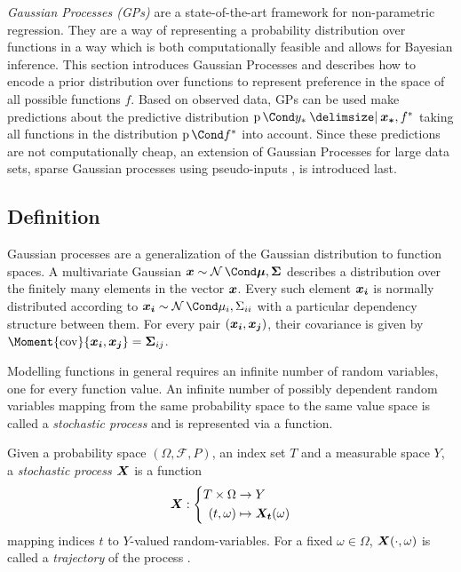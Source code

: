 \emph{Gaussian Processes (GPs)} are a state-of-the-art framework for non-parametric regression.
They are a way of representing a probability distribution over functions in a way which is both computationally feasible and allows for Bayesian inference.
This section introduces Gaussian Processes and describes how to encode a prior distribution over functions to represent preference in the space of all possible functions $f$.
Based on observed data, GPs can be used make predictions about the predictive distribution $\Prob{y_\ast \given \mat{x_\ast}, f^\ast}$ taking all functions in the distribution $\Prob{f^\ast}$ into account.
Since these predictions are not computationally cheap, an extension of Gaussian Processes for large data sets, sparse Gaussian processes using pseudo-inputs \cite{snelson_sparse_2005}, is introduced last.

\subsection{Definition}
Gaussian processes are a generalization of the Gaussian distribution to function spaces.
A multivariate Gaussian $\mat{x} \sim \Gaussian{\mat{\mu}, \mat{\Sigma}}$ describes a distribution over the finitely many elements in the vector $\bm{x}$.
Every such element $\bm{x_i}$ is normally distributed according to $\rv{x_i} \sim \Gaussian{\mu_i, \Sigma_{ii}}$ with a particular dependency structure between them.
For every pair $(\bm{x_i}, \bm{x_j})$, their covariance is given by $\Moment{\cov}{\rv{x_i}, \rv{x_j}} = \mat{\Sigma}_{ij}$.

Modelling functions in general requires an infinite number of random variables, one for every function value.
An infinite number of possibly dependent random variables mapping from the same probability space to the same value space is called a \emph{stochastic process} and is represented via a function.

\begin{definition}
    \label{def:stochastic_process}
    Given a probability space $(\Omega, \mathcal{F}, P)$, an index set $T$ and a measurable space $Y$, a \emph{stochastic process $\bm{X}$} is a function
    \begin{align}
        \bm{X} : \left\{\begin{aligned}
            T \times \Omega &\to Y \\
            (t, \omega) &\mapsto \bm{X_t}(\omega)
        \end{aligned}\right.
    \end{align}
    mapping indices $t$ to $Y$-valued random-variables.
    For a fixed $\omega \in \Omega$, $\bm{X}(\cdot, \omega)$ is called a \emph{trajectory} of the process \cite{astrom_introduction_1971}.
\end{definition}

